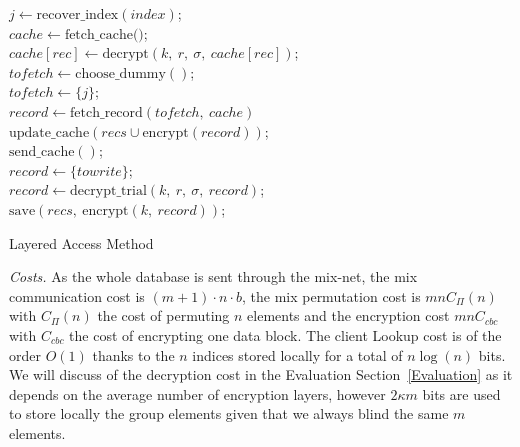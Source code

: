 \documentclass[USenglish,oneside,twocolumn]{article}
\begin{document}
\begin{algorithm}
\DontPrintSemicolon
{}
$j \gets \text{recover\_index}(index)$;\\
$cache \gets \text{fetch\_cache()}$;\\
{
$cache[rec]\gets \text{decrypt}(k,\ r,\ \sigma,\ cache[rec])$;\\
}
{
$tofetch \gets \text{choose\_dummy}()$;\\
}
\Else
{
$tofetch \gets \{j\}$;\\
}
$record \gets \text{fetch\_record}(tofetch,\ cache)$\\
$\text{update\_cache}(recs \cup \text{encrypt}(record))$;\\
$\text{send\_cache}()$;\\

{
$record \gets \{towrite\}$;\\
}
\Else
{
$record \gets \text{decrypt\_trial}(k,\ r,\ \sigma,\ record)$;\\
}
$\text{save}(recs,\ \text{encrypt}(k,\ record))$;\\
\caption{Layered Access Method}
\label{alg:lacc}
\end{algorithm}

\noindent\textit{Costs.}
As the whole database is sent through the mix-net, the mix communication cost is $ (m+1) \cdot n \cdot b$, the mix permutation cost is $mn C_{\Pi}(n)$ with $C_{\Pi}(n)$ the cost of permuting $n$ elements and the encryption cost $m n C_{cbc}$ with $C_{cbc}$ the cost of encrypting one data block. The client Lookup cost is of the order $O(1)$ thanks to the $n$ indices stored locally for a total of $n\log(n)$ bits. We will discuss of the decryption cost in the Evaluation Section~\ref{Evaluation} as it depends on the average number of encryption layers, however $2\kappa m$ bits are used to store locally the group elements given that we always blind the same $m$ elements.\\
\end{document}
